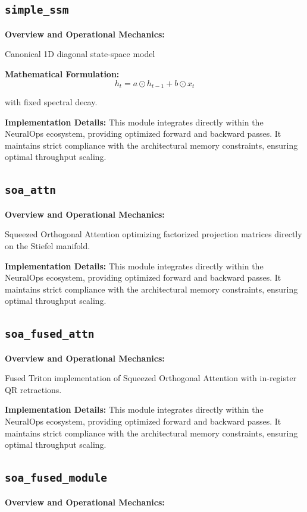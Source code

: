 \documentclass[10pt,twocolumn,letterpaper]{article}
\begin{document}
\subsection{\texttt{simple\_ssm}}
\textbf{Overview and Operational Mechanics:}

Canonical 1D diagonal state-space model

\textbf{Mathematical Formulation:}
\begin{equation}
h_t = a \odot h_{t-1} + b \odot x_t
\end{equation}

with fixed spectral decay.

\textbf{Implementation Details:}
This module integrates directly within the NeuralOps ecosystem, providing optimized forward and backward passes. It maintains strict compliance with the architectural memory constraints, ensuring optimal throughput scaling.

\subsection{\texttt{soa\_attn}}
\textbf{Overview and Operational Mechanics:}

Squeezed Orthogonal Attention optimizing factorized projection matrices directly on the Stiefel manifold.

\textbf{Implementation Details:}
This module integrates directly within the NeuralOps ecosystem, providing optimized forward and backward passes. It maintains strict compliance with the architectural memory constraints, ensuring optimal throughput scaling.

\subsection{\texttt{soa\_fused\_attn}}
\textbf{Overview and Operational Mechanics:}

Fused Triton implementation of Squeezed Orthogonal Attention with in-register QR retractions.

\textbf{Implementation Details:}
This module integrates directly within the NeuralOps ecosystem, providing optimized forward and backward passes. It maintains strict compliance with the architectural memory constraints, ensuring optimal throughput scaling.

\subsection{\texttt{soa\_fused\_module}}
\textbf{Overview and Operational Mechanics:}
\end{document}
